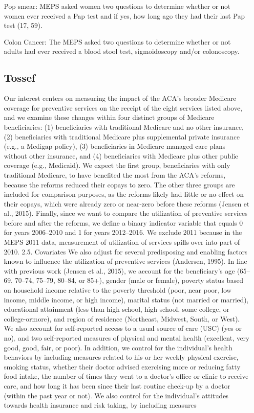 \documentclass[../main.tex]{subfiles}
\begin{document}
Pop smear: MEPS asked women two questions to determine whether or not women ever received a Pap test and if yes, how long ago they had their last Pap test (17, 59).

Colon Cancer:
The MEPS asked two questions to determine whether or not adults had ever received a blood stool test, sigmoidoscopy and/or colonoscopy.

\subsection{Tossef}

Our interest centers on measuring the impact of the ACA's broader Medicare coverage for preventive services on the receipt of the eight services listed above, and we examine these changes within four distinct groups of Medicare beneficiaries: (1) beneficiaries with traditional Medicare and no other insurance, (2) beneficiaries with traditional Medicare plus supplemental private insurance (e.g., a Medigap policy), (3) beneficiaries in Medicare managed care plans without other insurance, and (4) beneficiaries with Medicare plus other public coverage (e.g., Medicaid). We expect the first group, beneficiaries with only traditional Medicare, to have benefited the most from the ACA's reforms, because the reforms reduced their copays to zero. The other three groups are included for comparison purposes, as the reforms likely had little or no effect on their copays, which were already zero or near-zero before these reforms (Jensen et al., 2015). Finally, since we want to compare the utilization of preventive services before and after the reforms, we define a binary indicator variable that equals 0 for years 2006–2010 and 1 for years 2012–2016. We exclude 2011 because in the MEPS 2011 data, measurement of utilization of services spills over into part of 2010. 2.5. Covariates We also adjust for several predisposing and enabling factors known to influence the utilization of preventive services (Andersen, 1995). In line with previous work (Jensen et al., 2015), we account for the beneficiary's age (65–69, 70–74, 75–79, 80–84, or 85+), gender (male or female), poverty status based on household income relative to the poverty threshold (poor, near poor, low income, middle income, or high income), marital status (not married or married), educational attainment (less than high school, high school, some college, or college-ormore), and region of residence (Northeast, Midwest, South, or West). We also account for self-reported access to a usual source of care (USC) (yes or no), and two self-reported measures of physical and mental health (excellent, very good, good, fair, or poor). In addition, we control for the individual's health behaviors by including measures related to his or her weekly physical exercise, smoking status, whether their doctor advised exercising more or reducing fatty food intake, the number of times they went to a doctor's office or clinic to receive care, and how long it has been since their last routine check-up by a doctor (within the past year or not). We also control for the individual's attitudes towards health insurance and risk taking, by including measures
\end{document}
